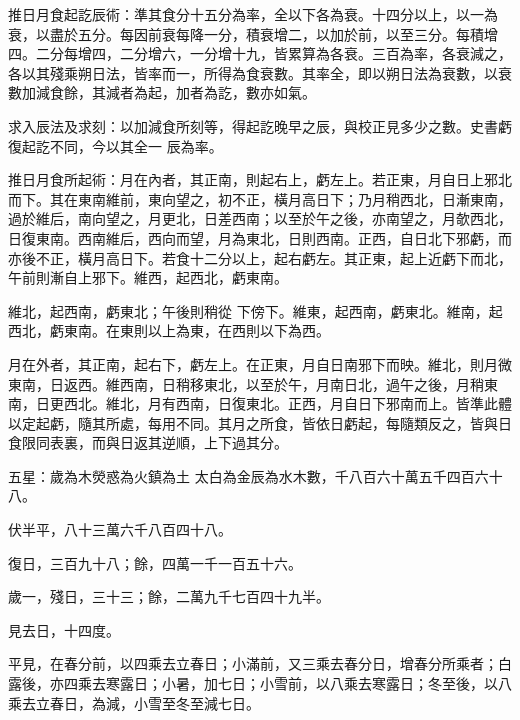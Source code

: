 \begin{pinyinscope}
 推日月食起訖辰術：準其食分十五分為率，全以下各為衰。十四分以上，以一為衰，以盡於五分。每因前衰每降一分，積衰增二，以加於前，以至三分。每積增四。二分每增四，二分增六，一分增十九，皆累算為各衰。三百為率，各衰減之，各以其殘乘朔日法，皆率而一，所得為食衰數。其率全，即以朔日法為衰數，以衰數加減食餘，其減者為起，加者為訖，數亦如氣。



 求入辰法及求刻：以加減食所刻等，得起訖晚早之辰，與校正見多少之數。史書虧復起訖不同，今以其全一
 辰為率。



 推日月食所起術：月在內者，其正南，則起右上，虧左上。若正東，月自日上邪北而下。其在東南維前，東向望之，初不正，橫月高日下；乃月稍西北，日漸東南，過於維后，南向望之，月更北，日差西南；以至於午之後，亦南望之，月欹西北，日復東南。西南維后，西向而望，月為東北，日則西南。正西，自日北下邪虧，而亦後不正，橫月高日下。若食十二分以上，起右虧左。其正東，起上近虧下而北，午前則漸自上邪下。維西，起西北，虧東南。



 維北，起西南，虧東北；午後則稍從
 下傍下。維東，起西南，虧東北。維南，起西北，虧東南。在東則以上為東，在西則以下為西。



 月在外者，其正南，起右下，虧左上。在正東，月自日南邪下而映。維北，則月微東南，日返西。維西南，日稍移東北，以至於午，月南日北，過午之後，月稍東南，日更西北。維北，月有西南，日復東北。正西，月自日下邪南而上。皆準此體以定起虧，隨其所處，每用不同。其月之所食，皆依日虧起，每隨類反之，皆與日食限同表裏，而與日返其逆順，上下過其分。



 五星：歲為木熒惑為火鎮為土
 太白為金辰為水木數，千八百六十萬五千四百六十八。



 伏半平，八十三萬六千八百四十八。



 復日，三百九十八；餘，四萬一千一百五十六。



 歲一，殘日，三十三；餘，二萬九千七百四十九半。



 見去日，十四度。



 平見，在春分前，以四乘去立春日；小滿前，又三乘去春分日，增春分所乘者；白露後，亦四乘去寒露日；小暑，加七日；小雪前，以八乘去寒露日；冬至後，以八乘去立春日，為減，小雪至冬至減七日。




\end{pinyinscope}
